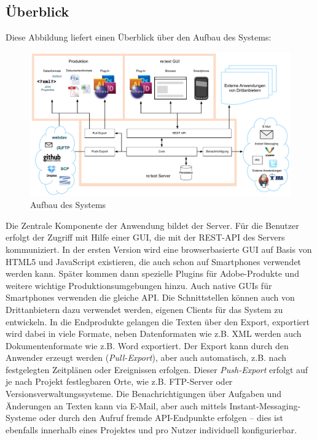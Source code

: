 \documentclass[11pt,a4paper]{article}
\begin{document}
\subsection{Überblick}

Diese Abbildung liefert einen Überblick über den Aufbau des Systems:

\begin{figure}[htb]
\begin{center}
\includegraphics[width=\textwidth]{media/System.pdf}
\caption{Aufbau des Systems}
\label{chart:1}
\end{center}
\end{figure}

Die Zentrale Komponente der Anwendung bildet der Server. Für die Benutzer erfolgt der Zugriff mit Hilfe einer GUI, die mit der REST-API des Servers kommuniziert. In der ersten Version wird eine browserbasierte GUI auf Basis von HTML5 und JavaScript existieren, die auch schon auf Smartphones verwendet werden kann. Später kommen dann spezielle Plugins für Adobe-Produkte und weitere wichtige Produktionsumgebungen hinzu. Auch native GUIs für Smartphones verwenden die gleiche API. Die Schnittstellen können auch von Drittanbietern dazu verwendet werden, eigenen Clients für das System zu entwickeln. In die Endprodukte gelangen die Texten über den Export, exportiert wird dabei in viele Formate, neben Datenformaten wie z.B. XML werden auch Dokumentenformate wie z.B. Word exportiert. Der Export kann durch den Anwender erzeugt werden (\emph{Pull-Export}), aber auch automatisch, z.B. nach festgelegten Zeitplänen oder Ereignissen erfolgen. Dieser \emph{Push-Export} erfolgt auf je nach Projekt festlegbaren Orte, wie z.B. FTP-Server oder Versionsverwaltungssysteme. Die Benachrichtigungen über Aufgaben und Änderungen an Texten kann via E-Mail, aber auch mittels Instant-Messaging-Systeme oder durch den Aufruf fremde API-Endpunkte erfolgen – dies ist ebenfalls innerhalb eines Projektes und pro Nutzer individuell konfigurierbar.
\end{document}
